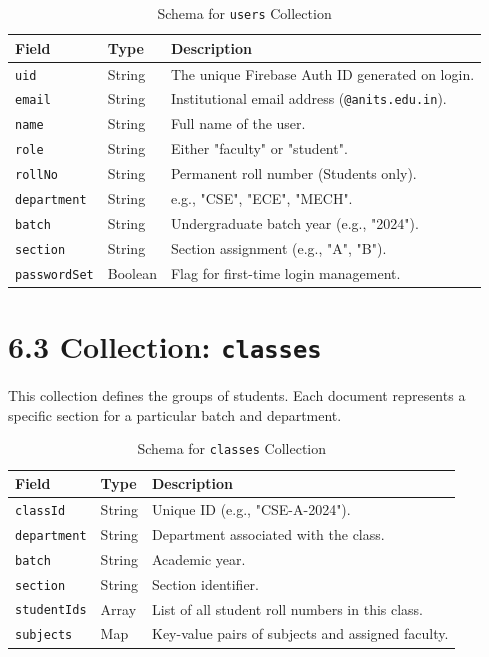 \documentclass[12pt,a4paper]{report}
\begin{document}
\begin{table}[H]
    \centering
    \caption{Schema for \texttt{users} Collection}
    \begin{tabularx}{\linewidth}{llX}
        \toprule
        \textbf{Field} & \textbf{Type} & \textbf{Description} \\
        \midrule
        \texttt{uid} & String & The unique Firebase Auth ID generated on login. \\
        \texttt{email} & String & Institutional email address (\texttt{@anits.edu.in}). \\
        \texttt{name} & String & Full name of the user. \\
        \texttt{role} & String & Either "faculty" or "student". \\
        \texttt{rollNo} & String & Permanent roll number (Students only). \\
        \texttt{department} & String & e.g., "CSE", "ECE", "MECH". \\
        \texttt{batch} & String & Undergraduate batch year (e.g., "2024"). \\
        \texttt{section} & String & Section assignment (e.g., "A", "B"). \\
        \texttt{passwordSet} & Boolean & Flag for first-time login management. \\
        \bottomrule
    \end{tabularx}
\end{table}

\section*{6.3 Collection: \texttt{classes}}
This collection defines the groups of students. Each document represents a specific section for a particular batch and department.

\begin{table}[H]
    \centering
    \caption{Schema for \texttt{classes} Collection}
    \begin{tabularx}{\linewidth}{llX}
        \toprule
        \textbf{Field} & \textbf{Type} & \textbf{Description} \\
        \midrule
        \texttt{classId} & String & Unique ID (e.g., "CSE-A-2024"). \\
        \texttt{department} & String & Department associated with the class. \\
        \texttt{batch} & String & Academic year. \\
        \texttt{section} & String & Section identifier. \\
        \texttt{studentIds} & Array & List of all student roll numbers in this class. \\
        \texttt{subjects} & Map & Key-value pairs of subjects and assigned faculty. \\
        \bottomrule
    \end{tabularx}
\end{table}
\end{document}
